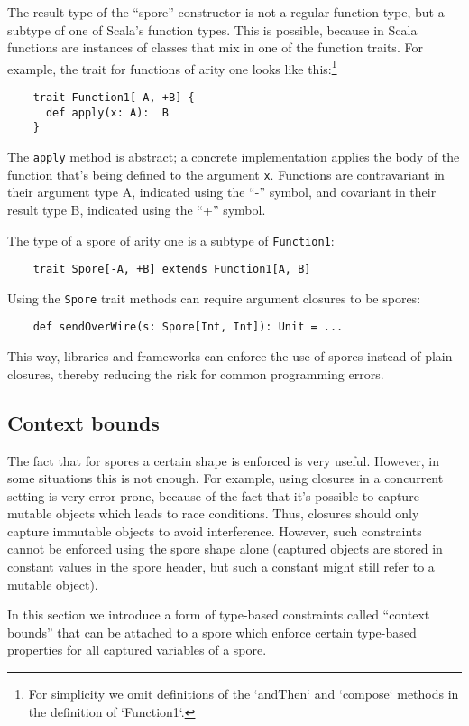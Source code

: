 The result type of the ``spore'' constructor is not a regular function type, but a subtype of one of Scala's function types. This is possible, because in Scala functions are instances of classes that mix in one of the function traits. For example, the trait for functions of arity one looks like this:\footnote{For simplicity we omit definitions of the `andThen` and `compose` methods in the definition of `Function1`.}

\begin{verbatim}
    trait Function1[-A, +B] {
      def apply(x: A):  B
    }
\end{verbatim}
\noindent
The \verb|apply| method is abstract; a concrete implementation applies the body
of the function that's being defined to the argument \verb|x|. Functions are
contravariant in their argument type A, indicated using the ``-'' symbol, and
covariant in their result type B, indicated using the ``+'' symbol.

The type of a spore of arity one is a subtype of \verb|Function1|:

\begin{verbatim}
    trait Spore[-A, +B] extends Function1[A, B]
\end{verbatim}
\noindent
Using the \verb|Spore| trait methods can require argument closures to be spores:

\begin{verbatim}
    def sendOverWire(s: Spore[Int, Int]): Unit = ...
\end{verbatim}
\noindent
This way, libraries and frameworks can enforce the use of spores instead of
plain closures, thereby reducing the risk for common programming errors.

\subsection{Context bounds}

The fact that for spores a certain shape is enforced is very useful. However, in
some situations this is not enough. For example, using closures in a concurrent
setting is very error-prone, because of the fact that it's possible to capture
mutable objects which leads to race conditions. Thus, closures should only
capture immutable objects to avoid interference. However, such constraints
cannot be enforced using the spore shape alone (captured objects are stored in
constant values in the spore header, but such a constant might still refer to a
mutable object).

In this section we introduce a form of type-based constraints called ``context
bounds'' that can be attached to a spore which enforce certain type-based
properties for all captured variables of a spore.

